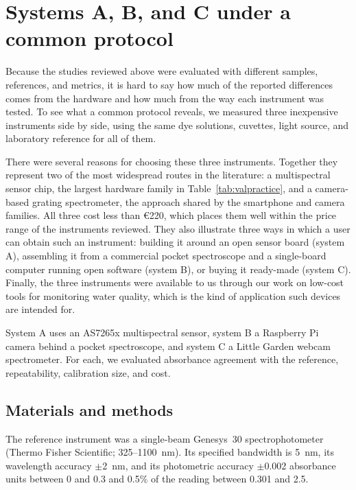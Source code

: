 \section{Systems A, B, and C under a common protocol}\label{sec:case}

Because the studies reviewed above were evaluated with different samples, references, and metrics, it is hard to say how much of the reported differences comes from the hardware and how much from the way each instrument was tested. To see what a common protocol reveals, we measured three inexpensive instruments side by side, using the same dye solutions, cuvettes, light source, and laboratory reference for all of them.

There were several reasons for choosing these three instruments. Together they represent two of the most widespread routes in the literature: a multispectral sensor chip, the largest hardware family in Table~\ref{tab:valpractice}, and a camera-based grating spectrometer, the approach shared by the smartphone and camera families. All three cost less than \euro{}220, which places them well within the price range of the instruments reviewed. They also illustrate three ways in which a user can obtain such an instrument: building it around an open sensor board (system A), assembling it from a commercial pocket spectroscope and a single-board computer running open software (system B), or buying it ready-made (system C). Finally, the three instruments were available to us through our work on low-cost tools for monitoring water quality, which is the kind of application such devices are intended for.

System A uses an AS7265x multispectral sensor, system B a Raspberry Pi camera behind a pocket spectroscope, and system C a Little Garden webcam spectrometer. For each, we evaluated absorbance agreement with the reference, repeatability, calibration size, and cost.

\subsection{Materials and methods}\label{sec2}

The reference instrument was a single-beam Genesys~30 spectrophotometer (Thermo Fisher Scientific; 325--1100~nm). Its specified bandwidth is 5~nm, its wavelength accuracy $\pm$2~nm, and its photometric accuracy $\pm$0.002 absorbance units between 0 and 0.3 and 0.5\% of the reading between 0.301 and 2.5.\citep{thermoGenesys30}


